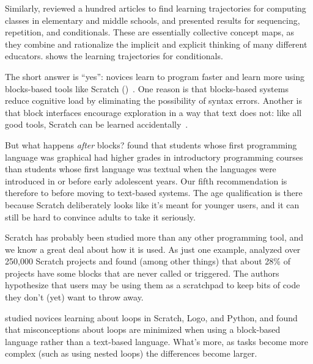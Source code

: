 Similarly,
\cite{Rich2017} reviewed a hundred articles to find learning trajectories for computing classes in elementary and middle schools,
and presented results for sequencing, repetition, and conditionals.
These are essentially collective concept maps,
as they combine and rationalize the implicit and explicit thinking of many different educators.
 shows the learning trajectories for conditionals.



The short answer is ``yes'':
novices learn to program faster and learn more using blocks-based tools like Scratch ()~\cite{Wein2017b}.
One reason is that blocks-based systems reduce cognitive load by eliminating the possibility of syntax errors.
Another is that block interfaces encourage exploration in a way that text does not:
like all good tools,
Scratch can be learned accidentally~\cite{Malo2010}.

But what happens \emph{after} blocks?
\cite{Chen2018} found that students whose first programming language was graphical
had higher grades in introductory programming courses
than students whose first language was textual
when the languages were introduced in or before early adolescent years.
Our fifth recommendation is therefore to
before moving to text-based systems.
The age qualification is there because Scratch deliberately looks like it's meant for younger users,
and it can still be hard to convince adults to take it seriously.


Scratch has probably been studied more than any other programming tool, and we know a great deal about how it is used. As just one example, \cite{Aiva2016} analyzed over 250,000 Scratch projects and found (among other things) that about 28\% of projects have some blocks that are never called or triggered. The authors hypothesize that users may be using them as a scratchpad to keep bits of code they don't (yet) want to throw away.

\cite{Grov2017,Mlad2017} studied novices learning about loops in Scratch, Logo, and Python, and found that misconceptions about loops are minimized when using a block-based language rather than a text-based language. What's more, as tasks become more complex (such as using
nested loops) the differences become larger.

